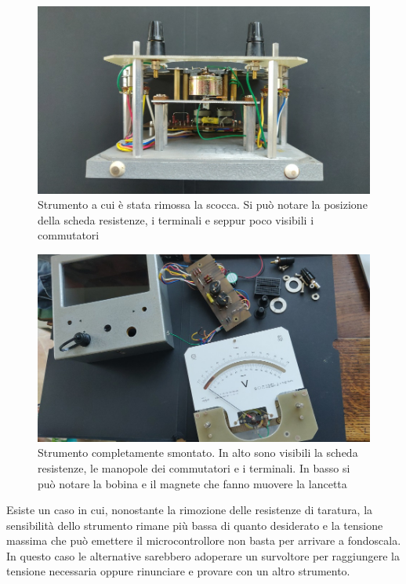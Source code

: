 \documentclass[12pt,a4paper]{report}
\begin{document}
\begin{figure}[h]
  \centering
  \includegraphics[width=\textwidth]{strumentosenzascocca}
  \caption{Strumento a cui è stata rimossa la scocca. Si può notare la posizione della scheda resistenze, i terminali e seppur poco visibili i commutatori}
  \label{fig:strumentosenzascocca}
\end{figure}

\begin{figure}[h]
  \centering
  \includegraphics[width=\textwidth]{strumentosmontato}
  \caption{Strumento completamente smontato. In alto sono visibili la scheda resistenze, le manopole dei commutatori e i terminali. In basso si può notare la bobina e il magnete che fanno muovere la lancetta}
  \label{fig:strumentosmontato}
\end{figure}


Esiste un caso in cui, nonostante la rimozione delle resistenze di taratura, la sensibilità dello strumento rimane più bassa di quanto
desiderato e la tensione massima che può emettere il microcontrollore non basta per arrivare a fondoscala. In questo caso le alternative
sarebbero adoperare un survoltore per raggiungere la tensione necessaria oppure rinunciare e provare con un altro strumento.
\end{document}
